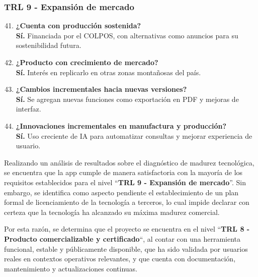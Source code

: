 \subsubsection*{TRL 9 - Expansión de mercado}
\begin{enumerate}
    \setcounter{enumi}{40}
    \item \textbf{¿Cuenta con producción sostenida?} \\ \textbf{Sí.} Financiada por el COLPOS, con alternativas como anuncios para su sostenibilidad futura.
    
    \item \textbf{¿Producto con crecimiento de mercado?} \\ \textbf{Sí.} Interés en replicarlo en otras zonas montañosas del país.
    
    \item \textbf{¿Cambios incrementales hacia nuevas versiones?} \\ \textbf{Sí.} Se agregan nuevas funciones como exportación en PDF y mejoras de interfaz.
    
    \item \textbf{¿Innovaciones incrementales en manufactura y producción?} \\ \textbf{Sí.} Uso creciente de IA para automatizar consultas y mejorar experiencia de usuario.
\end{enumerate}


Realizando un análisis de resultados sobre el diagnóstico de madurez tecnológica, se encuentra que la app cumple de manera satisfactoria con la mayoría de los requisitos establecidos para el nivel ``\textbf{TRL 9 - Expansión de mercado}''. Sin embargo, se identifica como aspecto pendiente el establecimiento de un plan formal de licenciamiento de la tecnología a terceros, lo cual impide declarar con certeza que la tecnología ha alcanzado su máxima madurez comercial.

Por esta razón, se determina que el proyecto se encuentra en el nivel ``\textbf{TRL 8 - Producto comercializable y certificado}``, al contar con una herramienta funcional, estable y públicamente disponible, que ha sido validada por usuarios reales en contextos operativos relevantes, y que cuenta con documentación, mantenimiento y actualizaciones continuas.



